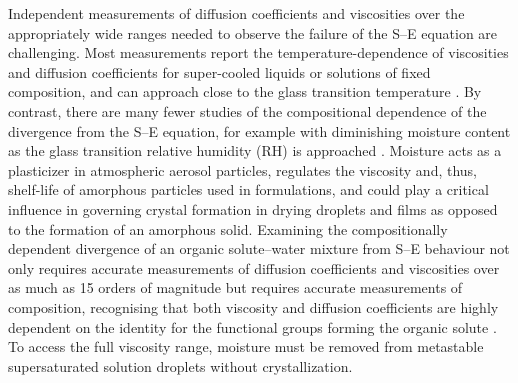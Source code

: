 Independent measurements of diffusion coefficients and viscosities over the appropriately wide ranges needed to observe the failure of the S–E equation are challenging. Most measurements report the temperature-dependence of viscosities and diffusion coefficients for super-cooled liquids or solutions of fixed composition, and can approach close to the glass transition temperature \cite{chenStokesEinsteinRelationSupercooled2006,Shrestha2015,Chen2006a,Gonzalez2015}. By contrast, there are many fewer studies of the compositional dependence of the divergence from the S–E equation, for example with diminishing moisture content as the glass transition relative humidity (RH) is approached \cite{powerTransitionLiquidSolidlike2013,Price2014,Price2015,Chenyakin2017,price2016sucrose,Bastelberger2017a}. Moisture acts as a plasticizer in atmospheric aerosol particles, regulates the viscosity and, thus, shelf-life of amorphous particles used in formulations, and could play a critical influence in governing crystal formation in drying droplets and films as opposed to the formation of an amorphous solid. Examining the compositionally dependent divergence of an organic solute–water mixture from S–E behaviour not only requires accurate measurements of diffusion coefficients and viscosities over as much as \num{15} orders of magnitude but requires accurate measurements of composition, recognising that both viscosity and diffusion coefficients are highly dependent on the identity for the functional groups forming the organic solute \cite{rothfuss2017influence}. To access the full viscosity range, moisture must be removed from metastable supersaturated solution droplets without crystallization. 

